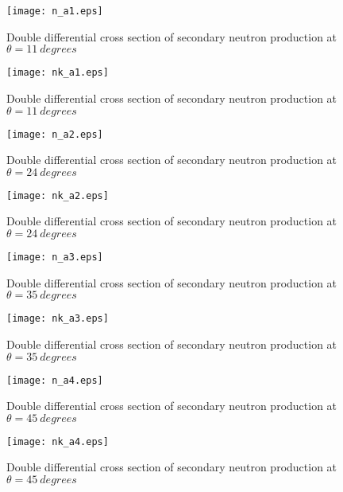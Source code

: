 \documentclass[12pt]{article}
\begin{document}
\begin{figure}[htbp]
\caption{Double differential cross section of secondary neutron production at $\theta = 11~degrees$}
\label{figa1} 
\centerline{\texttt{[image: n\_a1.eps]}}
\end{figure}

\begin{figure}[htbp]
\caption{Double differential cross section of secondary neutron production at $\theta = 11~degrees$}
\label{figa1a} 
\centerline{\texttt{[image: nk\_a1.eps]}}
\end{figure}

\begin{figure}[htbp]
\caption{Double differential cross section of secondary neutron production at $\theta = 24~degrees$}
\label{figa2} 
\centerline{\texttt{[image: n\_a2.eps]}}
\end{figure}

\begin{figure}[htbp]
\caption{Double differential cross section of secondary neutron production at $\theta = 24~degrees$}
\label{figa2a} 
\centerline{\texttt{[image: nk\_a2.eps]}}
\end{figure}

\clearpage

\begin{figure}[htbp]
\caption{Double differential cross section of secondary neutron production at $\theta = 35~degrees$}
\label{figa3} 
\centerline{\texttt{[image: n\_a3.eps]}}
\end{figure}

\begin{figure}[htbp]
\caption{Double differential cross section of secondary neutron production at $\theta = 35~degrees$}
\label{figa3a} 
\centerline{\texttt{[image: nk\_a3.eps]}}
\end{figure}

\begin{figure}[htbp]
\caption{Double differential cross section of secondary neutron production at $\theta = 45~degrees$}
\label{figa4} 
\centerline{\texttt{[image: n\_a4.eps]}}
\end{figure}

\begin{figure}[htbp]
\caption{Double differential cross section of secondary neutron production at $\theta = 45~degrees$}
\label{figa4a} 
\centerline{\texttt{[image: nk\_a4.eps]}}
\end{figure}
\end{document}
